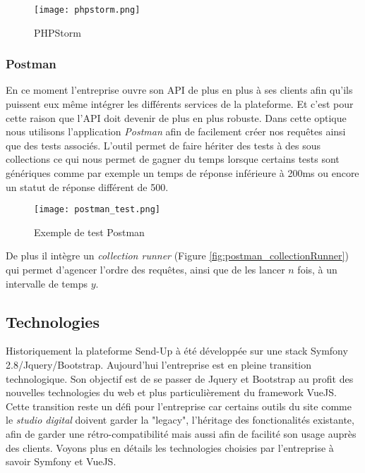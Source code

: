 \begin{figure}[htbp]
    \center 
    \texttt{[image: phpstorm.png]}
    \caption{PHPStorm}
\end{figure}


\subsubsection{Postman}

En ce moment l'entreprise ouvre son API de plus en plus à ses clients afin qu'ils puissent eux même intégrer les différents services de la plateforme. Et c'est pour cette raison que l'API doit devenir de plus en plus robuste. Dans cette optique nous utilisons l'application \textit{Postman}\cite{postman} afin de facilement créer nos requêtes ainsi que des tests associés. L'outil permet de faire hériter des tests à des sous collections ce qui nous permet de gagner du temps lorsque certains tests sont génériques comme par exemple un temps de réponse inférieure à 200ms ou encore un statut de réponse différent de 500. 

\begin{figure}[htbp]
    \center
        \texttt{[image: postman\_test.png]}
        \caption{Exemple de test Postman}
\end{figure}

De plus il intègre un \textit{collection runner} (Figure \ref{fig:postman_collectionRunner}) qui permet d'agencer l'ordre des requêtes, ainsi que de les lancer $n$ fois, à un intervalle de temps $y$. 


\subsection{Technologies}

Historiquement la plateforme Send-Up à été développée sur une stack Symfony 2.8/Jquery/Bootstrap. Aujourd'hui l'entreprise est en pleine transition technologique. Son objectif est de se passer de Jquery et Bootstrap au profit des nouvelles technologies du web et plus particulièrement du framework VueJS. Cette transition reste un défi pour l'entreprise car certains outils du site comme le \textit{studio digital} doivent garder la "legacy", l'héritage des fonctionalités existante, afin de garder une rétro-compatibilité mais aussi afin de facilité son usage auprès des clients. Voyons plus en détails les technologies choisies par l'entreprise à savoir Symfony et VueJS.

